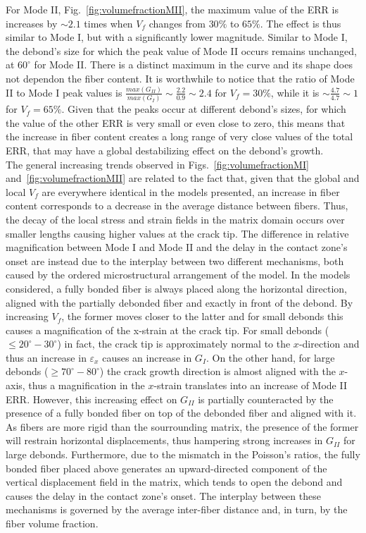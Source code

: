 \documentclass[review]{elsarticle}
\begin{document}
For Mode II, Fig.~\ref{fig:volumefractionMII}, the maximum value of the ERR is increases by $\sim 2.1$ times when $V_{f}$ changes from $30\%$ to $65\%$. The effect is thus similar to Mode I, but with a significantly lower magnitude. Similar to Mode I, the debond's size for which the peak value of Mode II occurs remains unchanged, at $60^{\circ}$ for Mode II. There is a distinct maximum in the curve and its shape does not dependon the fiber content. It is worthwhile to notice that the ratio of Mode II to Mode I peak values is $\frac{max\left(G_{II}\right)}{max\left(G_{I}\right)}\sim\frac{2.2}{0.9}\sim 2.4$ for $V_{f}=30\%$, while it is $\sim\frac{4.7}{4.7}\sim 1$ for $V_{f}=65\%$. Given that the peaks occur at different debond's sizes, for which the value of the other ERR is very small or even close to zero, this means that the increase in fiber content creates a long range of very close values of the total ERR, that may have a global destabilizing effect on the debond's growth.\\
The general increasing trends observed in Figs.~\ref{fig:volumefractionMI} and~\ref{fig:volumefractionMII} are related to the fact that, given that the global and local $V_{f}$ are everywhere identical in the models presented, an increase in fiber content corresponds to a decrease in the average distance between fibers. Thus, the decay of the local stress and strain fields in the matrix domain occurs over smaller lengths causing higher values at the crack tip. The difference in relative magnification between Mode I and Mode II and the delay in the contact zone's onset are instead due to the interplay between two different mechanisms, both caused by the ordered microstructural arrangement of the model. In the models considered, a fully bonded fiber is always placed along the horizontal direction, aligned with the partially debonded fiber and exactly in front of the debond. By increasing $V_{f}$, the former moves closer to the latter and for small debonds this causes a magnification of the x-strain at the crack tip. For small debonds ($\leq 20^{\circ}-30^{\circ}$) in fact, the crack tip is approximately normal to the $x$-direction and thus an increase in $\varepsilon_{x}$ causes an increase in $G_{I}$. On the other hand, for large debonds ($\geq 70^{\circ}-80^{\circ}$) the crack growth direction is almost aligned with the $x$-axis, thus a magnification in the $x$-strain translates into an increase of Mode II ERR. However, this increasing effect on $G_{II}$ is partially counteracted by the presence of a fully bonded fiber on top of the debonded fiber and aligned with it. As fibers are more rigid than the sourrounding matrix, the presence of the former will restrain horizontal displacements, thus hampering strong increases in $G_{II}$ for large debonds. Furthermore, due to the mismatch in the Poisson's ratios, the fully bonded fiber placed above generates an upward-directed component of the vertical displacement field in the matrix, which tends to open the debond and causes the delay in the contact zone's onset. The interplay between these mechanisms is governed by the average inter-fiber distance and, in turn, by the fiber volume fraction.
\end{document}
